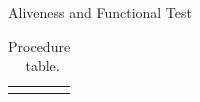 \begin{stepstable}{\subprocid{} Aliveness and Functional Test}
	
		\StopCegseSW{}

		\CopyCegseLogsForEvicences{\subprocid}{}
		\CopyOscilloscopeScreenShotsForEvidences
		\GetTempAndHumidityFromDatalogger

		\SetReduntanSideOnXbmaDisableMandC
		\RegisterTempAndHumidity
		\ClosePXISA

\end{stepstable}
\begin{longtable}{|p{17.0cm}|}
	\endfirsthead
	\endfoot
	\caption{Procedure \subprocid \ table.} \label{tb:proc:018-02}
\end{longtable}
